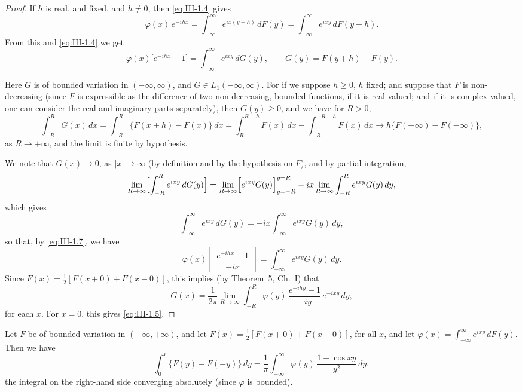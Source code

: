 \begin{proof}
If $h$ is real, and fixed, and $h\neq0$, then \eqref{eq:III-1.4} gives
\begin{equation}\tag{1.6}\label{eq:III-1.6}
\varphi(x)\,e^{-ihx}=\int_{-\infty}^{\infty}e^{ix(y-h)}\,dF(y)=\int_{-\infty}^{\infty}e^{ixy}\,dF(y+h).
\end{equation}
From this and \eqref{eq:III-1.4} we get
\begin{equation}\tag{1.7}\label{eq:III-1.7}
\varphi(x)\bigl[e^{-ihx}-1\bigr]=\int_{-\infty}^{\infty}e^{ixy}\,dG(y),\qquad G(y)=F(y+h)-F(y).
\end{equation}

Here $G$ is of bounded variation in $(-\infty,\infty)$, and $G\in L_{1}(-\infty,\infty)$. For if we suppose $h\ge0$, $h$ fixed; and suppose that $F$ is non-decreasing (since $F$ is expressible as the difference of two non-decreasing, bounded functions, if it is real-valued; and if it is complex-valued, one can consider the real and imaginary parts separately), then $G(y)\ge0$, and we have for $R>0$,
\[
\int_{-R}^{R}G(x)\,dx=\int_{-R}^{R}\bigl\{F(x+h)-F(x)\bigr\}\,dx
=\int_{R}^{R+h}F(x)\,dx-\int_{-R}^{-R+h}F(x)\,dx\to h\bigl\{F(+\infty)-F(-\infty)\bigr\},
\]
as $R\to+\infty$, and the limit is finite by hypothesis.

We note that $G(x)\to0$, as $|x|\to\infty$ (by definition and by the hypothesis on $F$), and by partial integration,
\[
\lim_{R\to\infty}\Bigl[\int_{-R}^{R}e^{ixy}\,dG(y)\Bigr]
=\lim_{R\to\infty}\Bigl[e^{ixy}G(y)\Bigr]_{y=-R}^{y=R}-ix\lim_{R\to\infty}\int_{-R}^{R}e^{ixy}G(y)\,dy,
\]
which gives
\[
\int_{-\infty}^{\infty}e^{ixy}\,dG(y)=-ix\int_{-\infty}^{\infty}e^{ixy}G(y)\,dy,
\]
so that, by \eqref{eq:III-1.7}, we have
\[
\varphi(x)\begin{bmatrix}\dfrac{e^{-ihx}-1}{-ix}\end{bmatrix}
=\int_{-\infty}^{\infty}e^{ixy}G(y)\,dy.
\]
Since $F(x)=\frac12[F(x+0)+F(x-0)]$, this implies (by Theorem~5, Ch.~I) that
\[
G(x)=\frac{1}{2\pi}\lim_{R\to\infty}\int_{-R}^{R}\varphi(y)\,\frac{e^{-ihy}-1}{-iy}\,e^{-ixy}\,dy,
\]
for each $x$. For $x=0$, this gives \eqref{eq:III-1.5}.
\end{proof}

\begin{theorem}\label{thm:III-2}
Let $F$ be of bounded variation in $(-\infty,+\infty)$, and let $F(x)=\frac12[F(x+0)+F(x-0)]$, for all $x$, and let $\varphi(x)=\int_{-\infty}^{\infty}e^{ixy}\,dF(y)$. Then we have
\begin{equation}\tag{1.8}\label{eq:III-1.8}
\int_{0}^{x}\bigl\{F(y)-F(-y)\bigr\}\,dy=\frac{1}{\pi}\int_{-\infty}^{\infty}\varphi(y)\,\frac{1-\cos xy}{y^{2}}\,dy,
\end{equation}
the integral on the right-hand side converging absolutely (since $\varphi$ is bounded).
\end{theorem}

